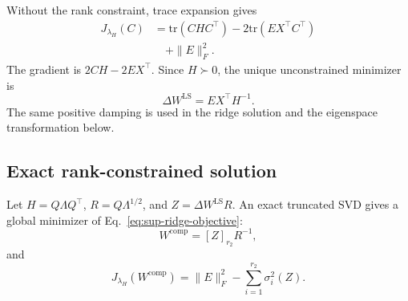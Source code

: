 Without the rank constraint, trace expansion gives
\begin{equation}
\begin{aligned}
J_{\lambda_H}(C)
&=\mathrm{tr}(CHC^\top)-2\mathrm{tr}(EX^\top C^\top) \\
&\quad+\|E\|_F^2.
\end{aligned}
\end{equation}
The gradient is $2CH-2EX^\top$. Since $H\succ0$, the unique unconstrained minimizer is
\begin{equation}
\Delta W^{\mathrm{LS}}=EX^\top H^{-1}.
\label{eq:sup-ridge-solution}
\end{equation}
The same positive damping is used in the ridge solution and the eigenspace transformation below.

\subsection{Exact rank-constrained solution}\label{sup:eigenspace-projection}

\begin{theorem*}
Let $H=Q\Lambda Q^\top$, $R=Q\Lambda^{1/2}$, and $Z=\Delta W^{\mathrm{LS}}R$. An exact truncated SVD gives a global minimizer of Eq.~\eqref{eq:sup-ridge-objective}:
\begin{equation}
W^{\mathrm{comp}}=[Z]_{r_2}R^{-1},
\label{eq:sup-eigenspace-comp}
\end{equation}
and
\begin{equation}
J_{\lambda_H}(W^{\mathrm{comp}})
=\|E\|_F^2-\sum_{i=1}^{r_2}\sigma_i^2(Z).
\end{equation}
\end{theorem*}

